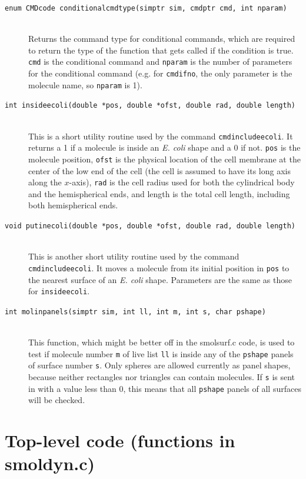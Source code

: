 \documentclass {scrbook}
\newcommand {\ttt} {\texttt}
\begin{document}
\begin{description}
\item[\ttt{enum CMDcode conditionalcmdtype(simptr sim, cmdptr cmd, int nparam)}]
\hfill \\
Returns the command type for conditional commands, which are required to return the type of the function that gets called if the condition is true. \ttt{cmd} is the conditional command and \ttt{nparam} is the number of parameters for the conditional command (e.g. for \ttt{cmdifno}, the only parameter is the molecule name, so \ttt{nparam} is 1).

\item[\ttt{int insideecoli(double *pos, double *ofst, double rad, double length)}]
\hfill \\
This is a short utility routine used by the command \ttt{cmdincludeecoli}. It returns a 1 if a molecule is inside an \emph{E. coli} shape and a 0 if not. \ttt{pos} is the molecule position, \ttt{ofst} is the physical location of the cell membrane at the center of the low end of the cell (the cell is assumed to have its long axis along the $x$-axis), \ttt{rad} is the cell radius used for both the cylindrical body and the hemispherical ends, and length is the total cell length, including both hemispherical ends.

\item[\ttt{void putinecoli(double *pos, double *ofst, double rad, double length)}]
\hfill \\
This is another short utility routine used by the command \ttt{cmdincludeecoli}. It moves a molecule from its initial position in \ttt{pos} to the nearest surface of an \emph{E. coli} shape. Parameters are the same as those for \ttt{insideecoli}.

\item[\ttt{int molinpanels(simptr sim, int ll, int m, int s, char pshape)}]
\hfill \\
This function, which might be better off in the smolsurf.c code, is used to test if molecule number \ttt{m} of live list \ttt{ll} is inside any of the \ttt{pshape} panels of surface number \ttt{s}. Only spheres are allowed currently as panel shapes, because neither rectangles nor triangles can contain molecules. If \ttt{s} is sent in with a value less than 0, this means that all \ttt{pshape} panels of all surfaces will be checked.

\end{description}

\section{Top-level code (functions in smoldyn.c)}
\end{document}
